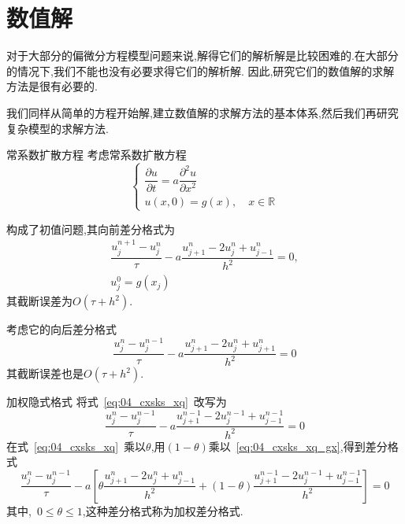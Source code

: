 \documentclass[xcolor=svgnames]{beamer} %
\begin{document}
\section{数值解}
\begin{frame}
对于大部分的偏微分方程模型问题来说,解得它们的解析解是比较困难的.在大部分的情况下,我们不能也没有必要求得它们的解析解.
因此,研究它们的数值解的求解方法是很有必要的.\par
我们同样从简单的方程开始解,建立数值解的求解方法的基本体系,然后我们再研究复杂模型的求解方法.
\end{frame}
\begin{frame}{常系数扩散方程}
 考虑常系数扩散方程
\begin{equation}\label{eq:04_cxsks_o}
\begin{cases}
 \dfrac{\partial u}{\partial t}=a\dfrac{\partial^2 u}{\partial x^2} \\
 u(x,0)=g(x),\quad x\in\mathbb{R}
\end{cases}
\end{equation}
\end{frame}
\begin{frame}
构成了初值问题,其向前差分格式为
\begin{gather}
 \dfrac{u_{j}^{n+1}-u_j^n}{\tau}-a\dfrac{u_{j+1}^n-2u_j^n+u_{j-1}^n}{h^2}=0,\label{eq:04_cxsks_xq}\\
 u_j^0 = g(x_j)
\end{gather}
其截断误差为$O(\tau+h^2)$.\par
考虑它的向后差分格式
\begin{equation}\label{eq:04_cxsks_xh}
 \dfrac{u_j^n-u_j^{n-1}}{\tau}-a\dfrac{u_{j+1}^n-2u_j^n+u_{j+1}^n}{h^2}=0
\end{equation}
其截断误差也是$O(\tau+h^2)$.
\end{frame}
\begin{frame}{加权隐式格式}
 将式~\eqref{eq:04_cxsks_xq}~改写为
\begin{equation}\label{eq:04_cxsks_xq_gx}
 \dfrac{u_j^n-u_j^{n-1}}{\tau}-a\dfrac{u_{j+1}^{n-1}-2u_{j}^{n-1}+u_{j-1}^{n-1}}{h^2}=0
\end{equation}
在式~\eqref{eq:04_cxsks_xq}~乘以$\theta$,用$(1-\theta)$乘以~\eqref{eq:04_cxsks_xq_gx},得到差分格式
\begin{equation}\label{eq:04_cxsks_js}
 \dfrac{u_j^n-u_j^{n-1}}{\tau}-a\left[\theta\dfrac{u_{j+1}^n-2u_j^n+u_{j-1}^n}{h^2}
 +(1-\theta)\dfrac{u_{j+1}^{n-1}-2u_j^{n-1}+u_{j-1}^{n-1}}{h^2}\right]=0
\end{equation}
其中,~$0\leq\theta\leq 1$,这种差分格式称为加权差分格式.
\end{frame}
\end{document}
